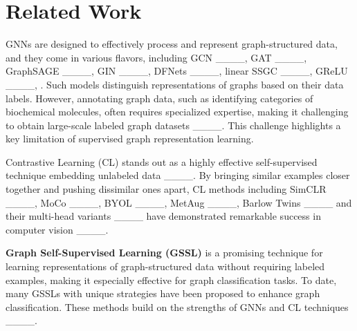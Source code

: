 \section{Related Work}
\label{sec:background}
GNNs are designed to effectively process and represent graph-structured data, and they come in various flavors, including GCN ____, GAT ____, GraphSAGE ____, GIN ____, DFNets ____, linear SSGC ____, GReLU ____, \etc. Such models distinguish representations of graphs based on their data labels. However, annotating graph data, such as identifying categories of biochemical molecules, often requires specialized expertise, making it challenging to obtain large-scale labeled graph datasets ____. This challenge highlights a key limitation of supervised graph representation learning.

Contrastive Learning (CL) stands out as a highly effective self-supervised technique embedding unlabeled data ____. By bringing similar examples closer together and pushing dissimilar ones apart, CL methods including SimCLR ____, MoCo ____, BYOL ____, MetAug ____, Barlow Twins ____ and their multi-head variants ____ have demonstrated remarkable success in  computer vision ____.

\vspace{0.1cm}
\noindent
\textbf{Graph Self-Supervised Learning (GSSL)} %
is a promising technique for learning representations of graph-structured data without requiring labeled examples, making it especially effective for graph classification tasks. To date, many GSSLs with unique strategies have been proposed to enhance  graph classification. These methods build on the strengths of GNNs and CL techniques ____.

